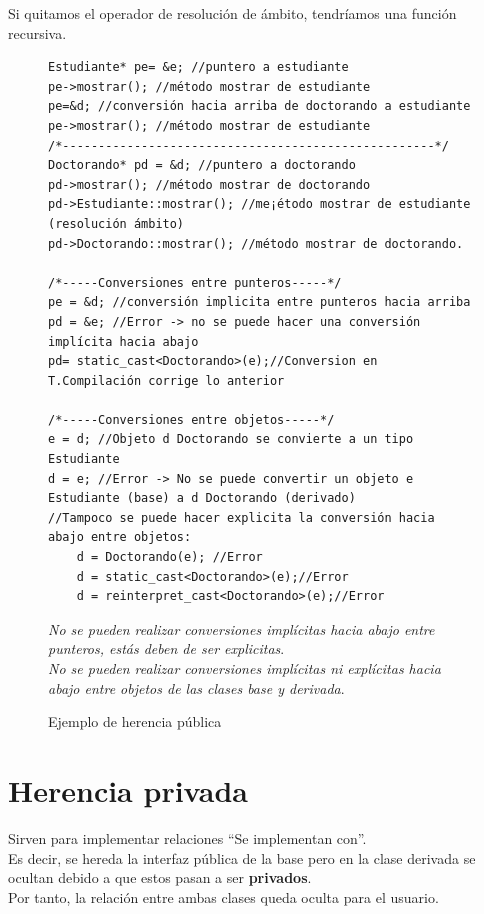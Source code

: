 Si quitamos el operador de resolución de ámbito, tendríamos una función recursiva.\\
\begin{center}
  \begin{figure}[h]
	\begin{lstlisting}[frame=single]
Estudiante* pe= &e; //puntero a estudiante
pe->mostrar(); //método mostrar de estudiante
pe=&d; //conversión hacia arriba de doctorando a estudiante
pe->mostrar(); //método mostrar de estudiante
/*----------------------------------------------------*/
Doctorando* pd = &d; //puntero a doctorando
pd->mostrar(); //método mostrar de doctorando
pd->Estudiante::mostrar(); //me¡étodo mostrar de estudiante (resolución ámbito)
pd->Doctorando::mostrar(); //método mostrar de doctorando.

/*-----Conversiones entre punteros-----*/
pe = &d; //conversión implicita entre punteros hacia arriba
pd = &e; //Error -> no se puede hacer una conversión implícita hacia abajo
pd= static_cast<Doctorando>(e);//Conversion en T.Compilación corrige lo anterior

/*-----Conversiones entre objetos-----*/
e = d; //Objeto d Doctorando se convierte a un tipo Estudiante
d = e; //Error -> No se puede convertir un objeto e Estudiante (base) a d Doctorando (derivado)
//Tampoco se puede hacer explicita la conversión hacia abajo entre objetos:
	d = Doctorando(e); //Error
	d = static_cast<Doctorando>(e);//Error
	d = reinterpret_cast<Doctorando>(e);//Error
	\end{lstlisting}
	\caption{Ejemplo de herencia pública}\vspace{1cm}
\textit{No se pueden realizar conversiones implícitas hacia abajo entre punteros, estás deben de ser explicitas}.\\

\textit{No se pueden realizar conversiones implícitas ni explícitas hacia abajo entre objetos de las clases base y derivada}.
	\end{figure}
\end{center}

\newpage
\section{Herencia privada}
\vspace{-0.5cm}
Sirven para implementar relaciones “Se implementan con”.\\
Es decir, se hereda la interfaz pública de la base pero en la clase derivada se ocultan debido a que estos pasan a ser \textbf{privados}.\\
Por tanto, la relación entre ambas clases queda oculta para el usuario.

